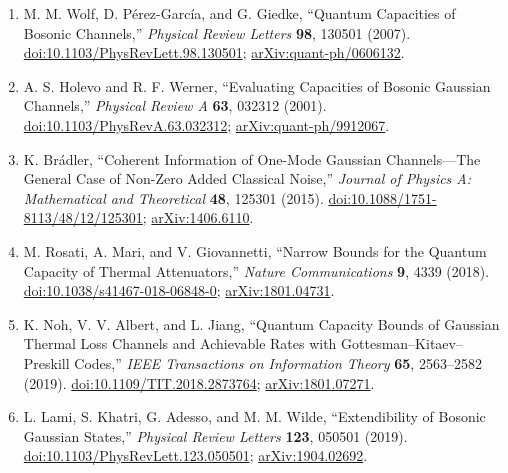 \begin{enumerate}[label={},leftmargin=4.8em,labelsep=0.5em]
  \footnotesize
  \item[\textup{[WPG07]}]\label{ref:p49-wolf-perez-garcia-giedke}
  M. M. Wolf, D. P\'erez-Garc\'ia, and G. Giedke,
  ``Quantum Capacities of Bosonic Channels,''
  \emph{Physical Review Letters} \textbf{98}, 130501 (2007).
  \href{https://doi.org/10.1103/PhysRevLett.98.130501}{doi:10.1103/PhysRevLett.98.130501};
  \href{https://arxiv.org/abs/quant-ph/0606132}{arXiv:quant-ph/0606132}.

  \item[\textup{[HW01]}]\label{ref:p49-holevo-werner}
  A. S. Holevo and R. F. Werner,
  ``Evaluating Capacities of Bosonic Gaussian Channels,''
  \emph{Physical Review A} \textbf{63}, 032312 (2001).
  \href{https://doi.org/10.1103/PhysRevA.63.032312}{doi:10.1103/PhysRevA.63.032312};
  \href{https://arxiv.org/abs/quant-ph/9912067}{arXiv:quant-ph/9912067}.

  \item[\textup{[Br15]}]\label{ref:p49-bradler}
  K. Br\'adler,
  ``Coherent Information of One-Mode Gaussian Channels---The General Case
  of Non-Zero Added Classical Noise,''
  \emph{Journal of Physics A: Mathematical and Theoretical} \textbf{48},
  125301 (2015).
  \href{https://doi.org/10.1088/1751-8113/48/12/125301}{doi:10.1088/1751-8113/48/12/125301};
  \href{https://arxiv.org/abs/1406.6110}{arXiv:1406.6110}.

  \item[\textup{[RMG18]}]\label{ref:p49-rosati-mari-giovannetti}
  M. Rosati, A. Mari, and V. Giovannetti,
  ``Narrow Bounds for the Quantum Capacity of Thermal Attenuators,''
  \emph{Nature Communications} \textbf{9}, 4339 (2018).
  \href{https://doi.org/10.1038/s41467-018-06848-0}{doi:10.1038/s41467-018-06848-0};
  \href{https://arxiv.org/abs/1801.04731}{arXiv:1801.04731}.

  \item[\textup{[NAJ19]}]\label{ref:p49-noh-albert-jiang}
  {\sloppy
  K. Noh, V. V. Albert, and L. Jiang,
  ``Quantum Capacity Bounds of Gaussian Thermal Loss Channels and
  Achievable Rates with Gottesman--Kitaev--Preskill Codes,''
  \emph{IEEE Transactions on Information Theory} \textbf{65}, 2563--2582
  (2019).
  \href{https://doi.org/10.1109/TIT.2018.2873764}{doi:10.1109/TIT.2018.2873764};
  \href{https://arxiv.org/abs/1801.07271}{arXiv:1801.07271}.
  \par}

  \item[\textup{[LKA+19]}]\label{ref:p49-lami-et-al}
  L. Lami, S. Khatri, G. Adesso, and M. M. Wilde,
  ``Extendibility of Bosonic Gaussian States,''
  \emph{Physical Review Letters} \textbf{123}, 050501 (2019).
  \href{https://doi.org/10.1103/PhysRevLett.123.050501}{doi:10.1103/PhysRevLett.123.050501};
  \href{https://arxiv.org/abs/1904.02692}{arXiv:1904.02692}.


\end{enumerate}
